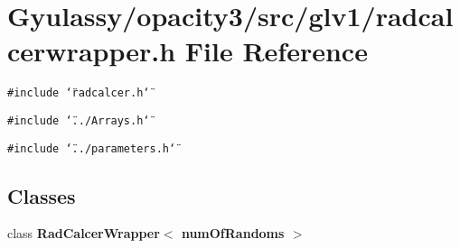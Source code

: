 \section{Gyulassy/opacity3/src/glv1/radcalcerwrapper.h File Reference}
\label{radcalcerwrapper_8h}
{\tt \#include \char`\"{}radcalcer.h\char`\"{}}\par
{\tt \#include \char`\"{}../Arrays.h\char`\"{}}\par
{\tt \#include \char`\"{}../parameters.h\char`\"{}}\par
\subsection*{Classes}
\begin{CompactItemize}
\item 
class {\bf RadCalcerWrapper$<$ numOfRandoms $>$}
\end{CompactItemize}
